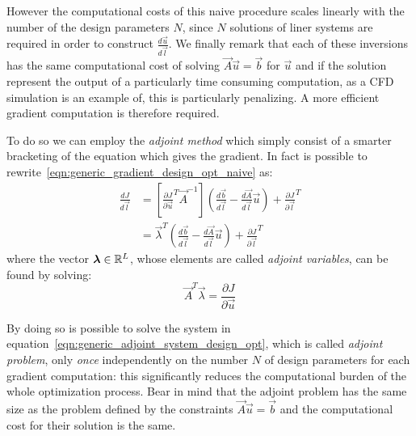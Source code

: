However the computational costs of this naive procedure scales linearly with the number of the design parameters $N$, since $N$ solutions of liner systems are required in order to construct $\frac{d\vec{u}}{d\vec{l}}$. We finally remark that each of these inversions has the same computational cost of solving $\vec{A} \vec{u}= \vec{b}$ for $\vec{u}$ and if the solution represent the output of a particularly time consuming computation, as a CFD simulation is an example of, this is particularly penalizing. A more efficient gradient computation is therefore required.

\smallskip
To do so we can employ the \emph{adjoint method} which simply consist of a smarter bracketing of the equation which gives the gradient. In fact is possible to rewrite~\eqref{eqn:generic_gradient_design_opt_naive} as:
\begin{equation}
	\begin{aligned}
		\frac{dJ}{d\vec{l}} & = \left[ \frac{\partial J}{\partial \vec{u}}^T \vec{A}^{-1} \right] \left( \frac{d\vec{b}}{d\vec{l}} - \frac{d\vec{A}}{d\vec{l}}\vec{u} \right) + \frac{\partial J}{\partial \vec{l}}^T  \\[2ex]
							& = \vec{\lambda}^T \left( \frac{d\vec{b}}{d\vec{l}} - \frac{d\vec{A}}{d\vec{l}}\vec{u} \right) + \frac{\partial J}{\partial \vec{l}}^T
	\end{aligned}
\end{equation}
where the vector $\boldsymbol{\lambda} \in \mathbb{R}^L$, whose elements are called \emph{adjoint variables}, can be found by solving:
\begin{equation}
	\label{eqn:generic_adjoint_system_design_opt}
	\vec{A}^T \vec{\lambda} = \frac{\partial J}{\partial \vec{u}}
\end{equation}

By doing so is possible to solve the system in equation~\eqref{eqn:generic_adjoint_system_design_opt}, which is called \emph{adjoint problem}, only \emph{once} independently on the number $N$ of design parameters for each gradient computation: this significantly reduces the computational burden of the whole optimization process. Bear in mind that the adjoint problem has the same size as the problem defined by the constraints $\vec{A} \vec{u} = \vec{b}$ and the computational cost for their solution is the same.


